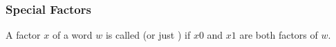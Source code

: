     
    

\subsubsection{Special Factors}

\begin{definition}
    A factor $x$ of a word $w$ is called  (or just ) if $x0$ and $x1$ are both factors of $w$.
\end{definition}

